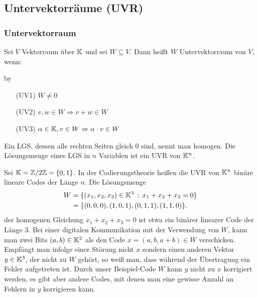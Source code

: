 \clearpage
\subsection{Untervektorräume (UVR)}
\subsubsection{Untervektorraum}

Sei $ V $ Vektorraum über $ \mathbb K $ und sei $ W \subseteq V $. Dann heißt $ W $ Untervektorraum von $ V $, wenn:

\advance\myindent by \the{}

\begin{itemize}[leftmargin=\myindent]
	\item[(UV1)]
		$ W \neq 0 $
	\item[(UV2)]
		$ v,w \in W \Rightarrow v+w \in W $
	\item[(UV3)]
		$ \alpha \in \mathbb K, v \in W \Rightarrow \alpha \cdot v \in W $
\end{itemize}

\begin{bem}
Ein LGS, dessen alle rechten Seiten gleich $0$ sind, nennt man homogen. Die Lösungsmenge eines LGS in $n$ Variablen ist ein UVR von $\mathbb K^n$. 
\end{bem}

\begin{bsp}
	Sei $\mathbb K = \mathbb Z/ 2 \mathbb Z = \{0,1\}$. In der Codierungstheorie heißen die UVR von $\mathbb K^n$ binäre lineare Codes der Länge $n$. Die Lösungsmenge 
	\begin{align*}
		W & = \{ (x_1,x_2,x_3) \in \mathbb K^3 \,:\, x_1 + x_2 + x_3 = 0 \}
		\\ & = \{ (0,0,0), (1,0,1), (0,1,1), (1,1,0) \}. 
	\end{align*}
	der homogenen Gleichung $x_1 + x_2 + x_3=0$ 
	ist etwa ein binärer linearer Code der Länge $3$. Bei einer digitalen Kommunikation mit der Verwendung von $W$, kann man zwei Bits $(a,b) \in \mathbb K^2$ als den Code $x=(a, b, a+b) \in W$ verschicken. Empfängt man infolge einer Störung nicht $x$ sondern einen anderen Vektor $y \in \mathbb K^3$, der nicht zu $W$ gehört, so weiß man, dass während der Übertragung ein Fehler aufgetreten ist. Durch unser Beispiel-Code $W$ kann $y$ nicht zu $x$ korrigiert werden, es gibt aber andere Codes, mit denen man eine gewisse Anzahl an Fehlern in $y$ korrigieren kann. 
\end{bsp} 

